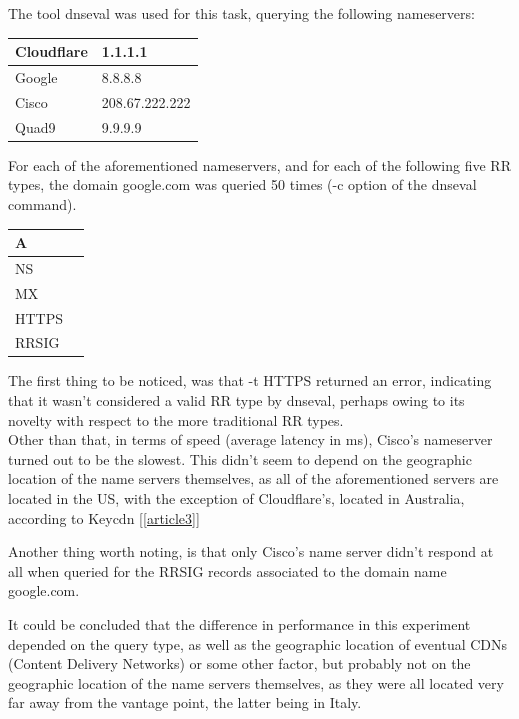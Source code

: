 \documentclass[a4paper,10pt]{article}
\begin{document}
The tool dnseval was used for this task, querying the following nameservers: 

\begin{table}[h!]
\centering
\begin{tabular}{|l|l|}
\hline
Cloudflare & 1.1.1.1        \\ \hline
Google     & 8.8.8.8        \\ \hline
Cisco      & 208.67.222.222 \\ \hline
Quad9      & 9.9.9.9        \\ \hline
\end{tabular}
\label{fig:table4}
\end{table}

For each of the aforementioned nameservers, and for each of the following five RR types,
the domain google.com was queried 50 times (-c option of the dnseval command). 


\begin{table}[h!]
\centering
\begin{tabular}{|l|l|}
\hline
A    \\ \hline
NS     \\ \hline
MX \\ \hline
HTTPS              \\ \hline
RRSIG              \\ \hline
\end{tabular}
\label{fig:table4}
\end{table}


The first thing to be noticed, was that -t HTTPS returned an error, indicating that it wasn't considered a valid RR type by dnseval, perhaps owing to its novelty with respect to the more traditional RR types.\\

Other than that, in terms of speed (average latency in ms), Cisco's nameserver turned out to be the slowest. This didn't seem to depend on the geographic location of the name servers themselves, as all of the aforementioned servers are located in the US, with the exception of Cloudflare's, located in Australia, according to Keycdn [\ref{article3}] 

Another thing worth noting, is that only Cisco's name server didn't respond at all when queried for the RRSIG records associated to the domain name google.com.

It could be concluded that the difference in performance in this experiment depended on the query type, as well as the geographic location of eventual CDNs (Content Delivery Networks) or some other factor, but probably not on the geographic location of the name servers themselves, as they were all located very far away from the vantage point, the latter being in Italy.
\end{document}
